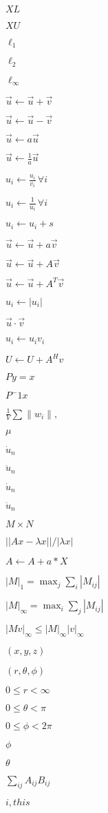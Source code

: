\documentclass{article}
\begin{document}
$ XL $
\pagebreak

$ XU $
\pagebreak

$ \ell_1 $
\pagebreak

$ \ell_2 $
\pagebreak

$ \ell_{\infty} $
\pagebreak

$ \vec{u} \leftarrow \vec{u} + \vec{v} $
\pagebreak

$ \vec{u} \leftarrow \vec{u} - \vec{v} $
\pagebreak

$ \vec{u} \leftarrow a\vec{u} $
\pagebreak

$ \vec{u} \leftarrow \frac{1}{a}\vec{u} $
\pagebreak

$ u_i \leftarrow \frac{u_i}{v_i} \, \forall i$
\pagebreak

$ u_i \leftarrow \frac{1}{u_i} \, \forall i$
\pagebreak

$ u_i \leftarrow u_i + s $
\pagebreak

$ \vec{u} \leftarrow \vec{u} + a\vec{v} $
\pagebreak

$ \vec{u} \leftarrow \vec{u} + A \vec{v} $
\pagebreak

$ \vec{u} \leftarrow \vec{u} + A^T \vec{v} $
\pagebreak

$ u_i \leftarrow |u_i| $
\pagebreak

$ \vec{u} \cdot \vec{v} $
\pagebreak

$ u_i \leftarrow u_i v_i $
\pagebreak

$ U \leftarrow U + A^H v $
\pagebreak

$ Py=x $
\pagebreak

$ P^-1 x $
\pagebreak

$ \frac{1}{V} \sum \|w_i\|, $
\pagebreak

$ \mu $
\pagebreak

$\dot{u}_n$
\pagebreak

$\ddot{u}_n$
\pagebreak

$ \dot{u}_n $
\pagebreak

$ \ddot{u}_n $
\pagebreak

$ M \times N $
\pagebreak

$ ||A x - \lambda x|| / |\lambda x| $
\pagebreak

$ A \leftarrow A + a*X $
\pagebreak

$ |M|_1 = \max_{j} \sum_{i} |M_{ij}| $
\pagebreak

$ |M|_{\infty} = \max_{i} \sum_{j} |M_{ij}| $
\pagebreak

$ |Mv|_{\infty} \leq |M|_{\infty} |v|_{\infty} $
\pagebreak

$ (x, y, z) $
\pagebreak

$ (r, \theta, \phi) $
\pagebreak

$ 0 \le r < \infty $
\pagebreak

$ 0 \le \theta < \pi $
\pagebreak

$ 0 \le \phi < 2\pi $
\pagebreak

$ \phi $
\pagebreak

$ \theta $
\pagebreak

$ \sum_{ij} A_{ij} B_{ij} $
\pagebreak

$ i,this $
\pagebreak
\end{document}
